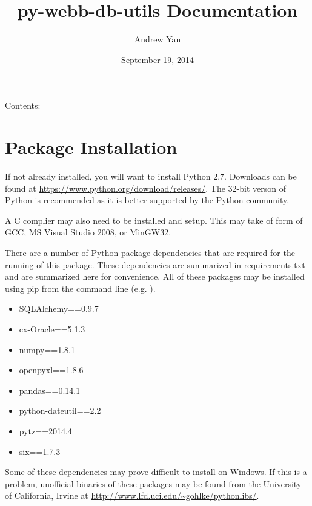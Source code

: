 \documentclass[letterpaper,10pt,english]{sphinxmanual}
\title{py-webb-db-utils Documentation}
\date{September 19, 2014}
\author{Andrew Yan}
\begin{document}
\maketitle
\tableofcontents
{}\label{webb_utils_doc::doc}


Contents:


\chapter{Package Installation}
\label{installation::doc}\label{installation:welcome-to-py-webb-db-utils-s-documentation}\label{installation:package-installation}
If not already installed, you will want to install Python 2.7. Downloads can be found
at \href{https://www.python.org/download/releases/}{https://www.python.org/download/releases/}. The 32-bit verson of Python is recommended
as it is better supported by the Python community.

A C complier may also need to be installed and setup. This may take of form of GCC,
MS Visual Studio 2008, or MinGW32.

There are a number of Python package dependencies that are required for the running
of this package. These dependencies are summarized in requirements.txt and are summarized
here for convenience. All of these packages may be installed using pip from the command line
(e.g. ).
\begin{itemize}
\item {} 
SQLAlchemy==0.9.7

\item {} 
cx-Oracle==5.1.3

\item {} 
numpy==1.8.1

\item {} 
openpyxl==1.8.6

\item {} 
pandas==0.14.1

\item {} 
python-dateutil==2.2

\item {} 
pytz==2014.4

\item {} 
six==1.7.3

\end{itemize}

Some of these dependencies may prove difficult to install on Windows. If this is a problem, unofficial
binaries of these packages may be found from the University of California, Irvine at
\href{http://www.lfd.uci.edu/~gohlke/pythonlibs/}{http://www.lfd.uci.edu/\textasciitilde{}gohlke/pythonlibs/}.
\end{document}
